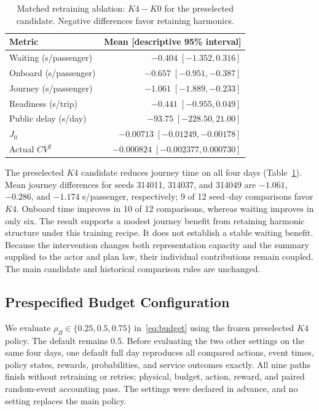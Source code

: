 \begin{table}[t]
\centering
\caption{Matched retraining ablation: $K4-K0$ for the preselected candidate.
Negative differences favor retaining harmonics.}
\label{tab:harmonic}
\setlength{\tabcolsep}{4pt}
\footnotesize
\begin{tabular}{lr}
\toprule
Metric & Mean [descriptive 95\% interval] \\
\midrule
Waiting (s/passenger) & $-0.404\;[-1.352,0.316]$ \\
Onboard (s/passenger) & $-0.657\;[-0.951,-0.387]$ \\
Journey (s/passenger) & $-1.061\;[-1.889,-0.233]$ \\
Readiness (s/trip) & $-0.441\;[-0.955,0.049]$ \\
Public delay (s/day) & $-93.75\;[-228.50,21.00]$ \\
$J_0$ & $-0.00713\;[-0.01249,-0.00178]$ \\
Actual $CV^2$ & $-0.000824\;[-0.002377,0.000730]$ \\
\bottomrule
\end{tabular}
\end{table}

The preselected $K4$ candidate reduces journey time on all four days
(Table~\ref{tab:harmonic}). Mean journey differences for seeds 314011, 314037,
and 314049 are $-1.061$, $-0.286$, and $-1.174$ s/passenger, respectively;
9 of 12 seed--day comparisons favor $K4$. Onboard time improves in 10 of 12
comparisons, whereas waiting improves in only six. The result supports a
modest journey benefit from retaining harmonic structure under this training
recipe. It does not establish a stable waiting benefit. Because the
intervention changes both representation capacity and the summary supplied to
the actor and plan law, their individual contributions remain coupled.
The main candidate and historical comparison rules are unchanged.

\subsection{Prespecified Budget Configuration}
\label{sec:budget_settings}

We evaluate $\rho_B\in\{0.25,0.5,0.75\}$ in~\eqref{eq:budget} using the
frozen preselected $K4$ policy. The default remains 0.5. Before evaluating the
two other settings on the same four days, one default full day reproduces all
compared actions, event times, policy states, rewards, probabilities, and
service outcomes exactly. All nine paths finish without retraining or retries;
physical, budget, action, reward, and paired random-event accounting pass.
The settings were declared in advance, and no setting replaces the main policy.

